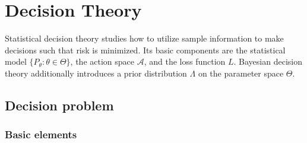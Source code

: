 \section{Decision Theory}
Statistical decision theory studies how to utilize sample information to make decisions such that risk is minimized. 
Its basic components are the statistical model $\{P_\theta:\theta\in\Theta\}$, the action space $\mathcal{A}$, and the loss function $L$. Bayesian decision theory additionally introduces a prior distribution $\Lambda$ on the parameter space $\Theta$.

\subsection{Decision problem}
\subsubsection{Basic elements}
